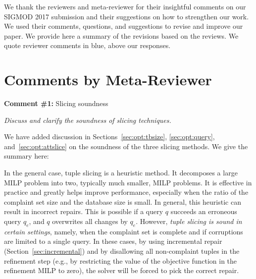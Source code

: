 


\newcommand{\reviewer}[1]{\itshape{{\color{commentColor} #1}}}
\newcommand{\comskip}{\bigskip}


\renewenvironment{quote}
{\vspace{-1mm}\list{}{\rightmargin=0cm \leftmargin=0cm}%
\item\relax}
{\endlist}

We thank the reviewers and meta-reviewer for their insightful comments on our
SIGMOD 2017 submission and their suggestions on how to strengthen our work. We
used their comments, questions, and suggestions to revise and improve our
paper. We provide here a summary of the revisions based on the reviews. We
quote reviewer comments in blue, above our responses.

\section*{Comments by Meta-Reviewer}

\noindent
\textbf{Comment \#1:} Slicing soundness
\begin{quote}
\reviewer{
Discuss and clarify the soundness of slicing techniques.
}
\end{quote}

We have added discussion in Sections~\ref{sec:opt:tbsize},
\ref{sec:opt:query}, and~\ref{sec:opt:attslice} on the soundness of the three
slicing methods.  We give the summary here:

In the general case, tuple slicing is a heuristic method. It decomposes a
large MILP problem into two, typically much smaller, MILP problems. It is
effective in practice and greatly helps improve \sys performance, especially
when the ratio of the complaint set size and the database size is small. In
general, this heuristic can result in incorrect repairs. This is possible if a
query $q$ succeeds an erroneous query $q_e$, and $q$ overwrites all changes by
$q_e$. However, \emph{tuple slicing is sound in certain settings}, namely,
when the complaint set is complete and if corruptions are limited to a single
query. In these cases, by using incremental repair
(Section~\ref{sec:incremental}) and by disallowing all non-complaint tuples in
the refinement step (e.g., by restricting the value of the objective function
in the refinement MILP to zero), the solver will be forced to pick the correct
repair.



